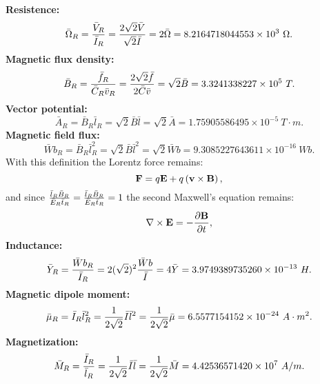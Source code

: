 \documentclass[12pt,a4paper]{article}
\def\barohmry{8.2164718044553\times 10^{3}}
\def\barbry{3.3241338227\times 10^{5}}
\def\baravry{1.75905586495\times 10^{-5}}
\def\barwbry{9.3085227643611\times 10^{-16}}
\def\baryry{3.9749389735260\times 10^{-13}}
\def\barmury{6.5577154152\times 10^{-24}}
\def\barmagry{4.42536571420\times 10^{7}}
\begin{document}
{\begin{equation}
\end{equation}
{\bf Resistence:}
\begin{equation}
\bar \Omega_R={\bar V_R \over \bar I_R}= {2 \sqrt{2} \bar V \over \sqrt{2} 
\bar I}
= 2 \bar \Omega=\barohmry\ \Omega.
\end{equation}
{\bf Magnetic flux density:}
\begin{equation}
\bar B_R={\bar f_R \over \bar C_R \bar v_R}= {2 \sqrt{2} \bar f \over 2 
\bar C \bar v}
= \sqrt{2} \bar B=\barbry\ T.
\end{equation}
{\bf Vector potential:}
\begin{equation}
\bar A_R={\bar B_R \bar l_R }= \sqrt{2} \bar B \bar l 
= \sqrt{2} \bar A=\baravry\ T\cdot m.
\end{equation}
{\bf Magnetic field flux:}
\begin{equation}
\bar Wb_R={\bar B_R \bar l_R^2 }= \sqrt{2} \bar B \bar l^2
= \sqrt{2} \bar Wb=\barwbry\ Wb.
\end{equation}
With this definition the Lorentz force remains:
\begin{equation}
{\bf F}=q {\bf E} + q \left({\bf v}\times {\bf B}\right),
\end{equation}
and since ${\bar l_R \bar B_R \over \bar E_R \bar t_R}={\bar l_R \bar B_R \over \bar E_R \bar t_R}=1$ the second Maxwell's equation remains:
\begin{equation}
\nabla\times {\bf E}=-{\partial {\bf B}\over \partial t},
\end{equation}
{\bf Inductance:}
\begin{equation}
\bar Y_R={\bar Wb_R \over \bar I_R }= 2 (\sqrt{2})^2 {\bar Wb \over \bar I}
= 4 \bar Y=\baryry\ H.
\end{equation}
{\bf Magnetic dipole moment:}
\begin{equation}
\bar \mu_R={\bar I_R \bar l_R^2}= {1\over 2\sqrt{2}} {\bar I \bar l^2}
= {1\over 2\sqrt{2}} \bar \mu=\barmury\ A\cdot m^2.
\end{equation}
{\bf Magnetization:}
\begin{equation}
\bar M_R={\bar I_R \over \bar l_R}= {1\over 2\sqrt{2}} {\bar I \bar l}
= {1\over 2\sqrt{2}} \bar M=\barmagry\ A/m.
\end{equation}

}
\end{document}
